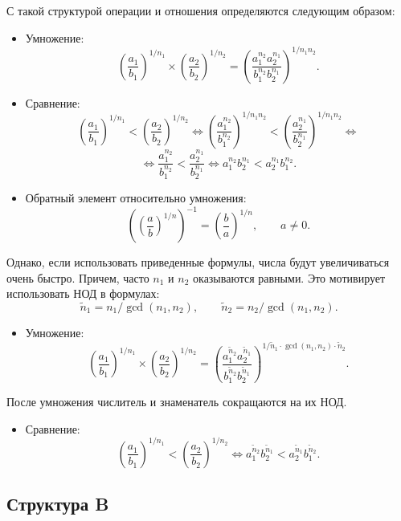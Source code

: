 \documentclass[specialist, substylefile = spbureport.rtx,
               subf,href,colorlinks=true, 12pt]{disser}
\begin{document}
    С такой структурой операции и отношения определяются следующим образом:
    \begin{itemize}
        \item Умножение:
        $$ \left(\frac{a_1}{b_1}\right)^{1/n_1} \times \left(\frac{a_2}{b_2}\right)^{1/n_2} = \left(\frac{a_1^{n_2}a_2^{n_1}}{b_1^{n_2}b_2^{n_1}}\right)^{1/n_1n_2}.$$
        \item Сравнение:
        $$ \left(\frac{a_1}{b_1}\right)^{1/n_1} < \left(\frac{a_2}{b_2}\right)^{1/n_2} \Leftrightarrow
        \left(\frac{a_1^{n_2}}{b_1^{n_2}}\right)^{1/n_1n_2} < \left(\frac{a_2^{n_1}}{b_2^{n_1}}\right)^{1/n_1n_2}\Leftrightarrow$$
        $$\Leftrightarrow
        \frac{a_1^{n_2}}{b_1^{n_2}} < \frac{a_2^{n_1}}{b_2^{n_1}}\Leftrightarrow
        {a_1^{n_2}}{b_2^{n_1}} < {a_2^{n_1}}{b_1^{n_2}}.$$
        \item Обратный элемент относительно умножения:
        $$ \left(\left(\frac{a}{b}\right)^{1/n}\right)^{-1} = \left(\frac{b}{a}\right)^{1/n}, \qquad a \neq 0.$$
    \end{itemize}

    Однако, если использовать приведенные формулы, числа будут увеличиваться очень быстро.
    Причем, часто $n_1$ и $n_2$ оказываются равными. Это мотивирует использовать НОД в формулах:
    $$\tilde{n}_1 = n_1 / \gcd(n_1, n_2), \qquad \tilde{n}_2 = n_2 / \gcd(n_1, n_2).$$

    \begin{itemize}
        \item Умножение:
        $$ \left(\frac{a_1}{b_1}\right)^{1/n_1} \times \left(\frac{a_2}{b_2}\right)^{1/n_2} = \left(\frac{a_1^{\tilde{n}_2}a_2^{\tilde{n}_1}}{b_1^{\tilde{n}_2}b_2^{\tilde{n}_1}}\right)^{1/\tilde{n}_1\cdot \gcd(n_1, n_2) \cdot \tilde{n}_2}.$$
    \end{itemize}
        После умножения числитель и знаменатель сокращаются на их НОД.
    \begin{itemize}
        \item Сравнение:
        $$ \left(\frac{a_1}{b_1}\right)^{1/n_1} < \left(\frac{a_2}{b_2}\right)^{1/n_2} \Leftrightarrow
        {a_1^{\tilde{n}_2}}{b_2^{\tilde{n}_1}} < {a_2^{\tilde{n}_1}}{b_1^{\tilde{n}_2}}.$$
    \end{itemize}

    \subsection{Структура B}
\end{document}
